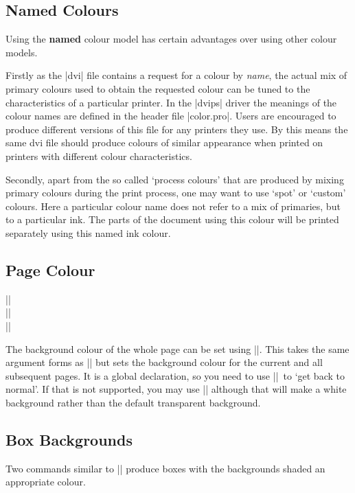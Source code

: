 \subsection{Named Colours}
Using the \textbf{named} colour model has certain advantages over
using other colour models. 

Firstly as the |dvi| file contains a request
for a colour by \emph{name}, the actual mix of primary colours used to
obtain the requested colour can be tuned to the characteristics of a
particular printer. In the |dvips| driver the meanings of the colour
names are defined in the header file |color.pro|. Users are encouraged
to produce different versions of this file for any printers they use. By
this means the same dvi file should produce colours of similar
appearance when printed on printers with different colour
characteristics.

Secondly, apart from the so called `process colours' that are produced
by mixing primary colours during the print process, one may want to use
`spot' or `custom' colours. Here a particular colour name does not
refer to a mix of primaries, but to a particular ink. The parts of the
document using this colour will be printed separately using this named
ink colour.

\subsection{Page Colour}


\begin{decl}
|\pagecolor|\\
|\pagecolor|\\
|\nopagecolor|
\end{decl}

The background colour of the whole page can be set using
|\pagecolor|. This takes the same argument forms as |\color| but sets
the background colour for the current and all subsequent pages. It is
a global declaration, so you need to  use
|\nopagecolor|\ to `get back to normal'.
If that is not supported, you may use |\pagecolor{white}| although that
will make a white background rather than the default transparent background.

\subsection{Box Backgrounds}
Two commands similar to |\fbox| produce boxes with the backgrounds
shaded an appropriate colour.

